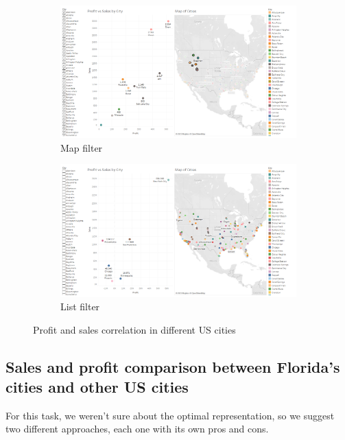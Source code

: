 \documentclass[openany]{article}
\begin{document}
\begin{figure}[h]\ContinuedFloat
	\centering
	\begin{subfigure}{\textwidth}
		\centering
		\includegraphics[width=\linewidth]{Tableau/c_2}
		\caption{Map filter}
		\label {map_filter}
	\end{subfigure}

	\begin{subfigure}{\textwidth}
		\centering
		\includegraphics[width=\linewidth]{Tableau/c_3}
		\caption{List filter}
		\label {list_filter}
	\end{subfigure}
	\caption{Profit and sales correlation in different US cities}
\end{figure}

\clearpage

\subsection {Sales and profit comparison between Florida's cities and other US cities}

For this task, we weren't sure about the optimal representation, so we suggest two different approaches, each one with its own pros and cons.
\end{document}
